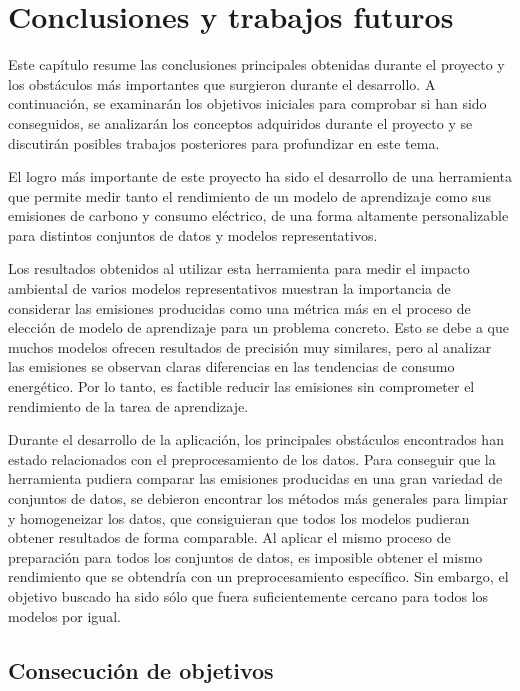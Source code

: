 \chapter{Conclusiones y trabajos futuros}
\label{chap:conclusiones}

Este capítulo resume las conclusiones principales obtenidas durante el proyecto y los obstáculos más importantes que surgieron durante el desarrollo. A continuación, se examinarán los objetivos iniciales para comprobar si han sido conseguidos, se analizarán los conceptos adquiridos durante el proyecto y se discutirán posibles trabajos posteriores para profundizar en este tema.

El logro más importante de este proyecto ha sido el desarrollo de una herramienta que permite medir tanto el rendimiento de un modelo de aprendizaje como sus emisiones de carbono y consumo eléctrico, de una forma altamente personalizable para distintos conjuntos de datos y modelos representativos.

Los resultados obtenidos al utilizar esta herramienta para medir el impacto ambiental de varios modelos representativos muestran la importancia de considerar las emisiones producidas como una métrica más en el proceso de elección de modelo de aprendizaje para un problema concreto. Esto se debe a que muchos modelos ofrecen resultados de precisión muy similares, pero al analizar las emisiones se observan claras diferencias en las tendencias de consumo energético. Por lo tanto, es factible reducir las emisiones sin comprometer el rendimiento de la tarea de aprendizaje.

Durante el desarrollo de la aplicación, los principales obstáculos encontrados han estado relacionados con el preprocesamiento de los datos. Para conseguir que la herramienta pudiera comparar las emisiones producidas en una gran variedad de conjuntos de datos, se debieron encontrar los métodos más generales para limpiar y homogeneizar los datos, que consiguieran que todos los modelos pudieran obtener resultados de forma comparable. Al aplicar el mismo proceso de preparación para todos los conjuntos de datos, es imposible obtener el mismo rendimiento que se obtendría con un preprocesamiento específico. Sin embargo, el objetivo buscado ha sido sólo que fuera suficientemente cercano para todos los modelos por igual.


\section{Consecución de objetivos}
\label{sec:consecucion-objetivos}

